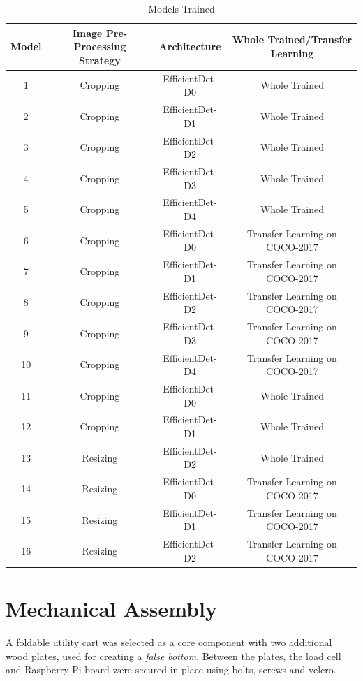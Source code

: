 \documentclass[openright]{normas-utf-tex} %
\begin{document}
\begin{table}[H]
	\centering
	\begin{adjustbox}{width=0.8\textwidth}
	\label{tab:modelsTrained}
	\begin{tabular}{c|c|c|c}
		\hline 
		Model & Image Pre-Processing Strategy & Architecture & Whole Trained/Transfer Learning \\
		\hline
        1 & Cropping & EfficientDet-D0 & Whole Trained \\
		2 & Cropping & EfficientDet-D1 & Whole Trained \\
		3 & Cropping & EfficientDet-D2 & Whole Trained \\
		4 & Cropping & EfficientDet-D3 & Whole Trained \\
		5 & Cropping & EfficientDet-D4 & Whole Trained \\
		6 & Cropping & EfficientDet-D0 & Transfer Learning on COCO-2017 \\
		7 & Cropping & EfficientDet-D1 & Transfer Learning on COCO-2017 \\
		8 & Cropping & EfficientDet-D2 & Transfer Learning on COCO-2017 \\
		9 & Cropping & EfficientDet-D3 & Transfer Learning on COCO-2017 \\
		10 & Cropping & EfficientDet-D4 & Transfer Learning on COCO-2017 \\
		11 & Cropping & EfficientDet-D0 & Whole Trained \\
		12 & Cropping & EfficientDet-D1 & Whole Trained \\
		13 & Resizing & EfficientDet-D2 & Whole Trained \\
		14 & Resizing & EfficientDet-D0 & Transfer Learning on COCO-2017 \\
		15 & Resizing & EfficientDet-D1 & Transfer Learning on COCO-2017 \\
		16 & Resizing & EfficientDet-D2 & Transfer Learning on COCO-2017 \\
		\hline 
	\end{tabular}
	\end{adjustbox}
	\caption[Models Trained]{Models Trained}
	\label{tbl:modelsTrainedTab}
\end{table}

\section{Mechanical Assembly}

A foldable utility cart was selected as a core
component with two additional wood plates, used for creating a \textit{false
bottom}. Between the plates, the load cell and Raspberry Pi board were secured
in place using bolts, screws and velcro.
\end{document}
